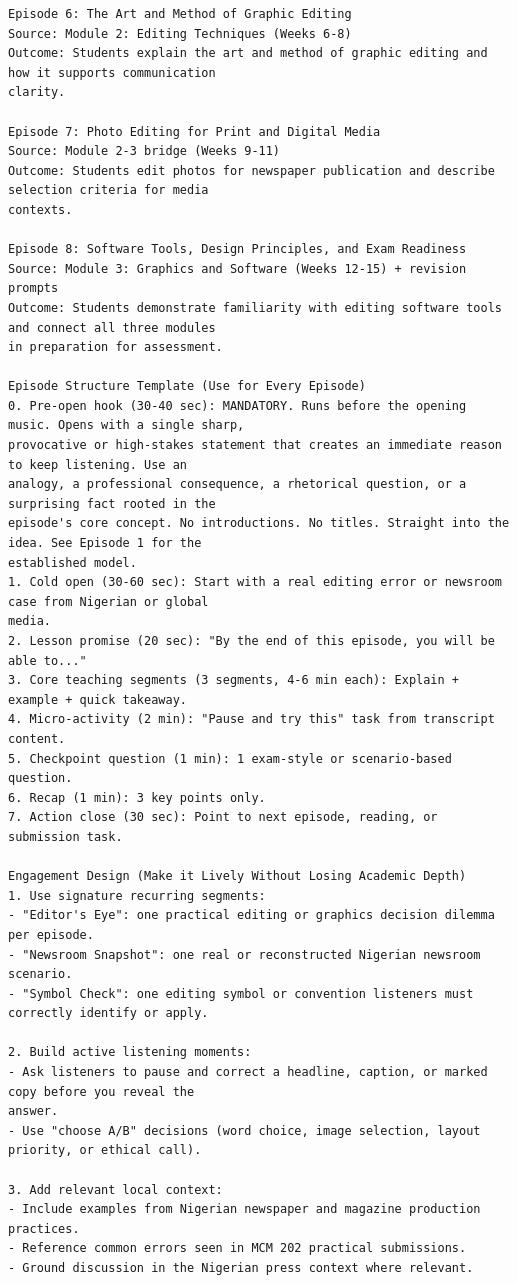 {\begin{Verbatim}
Episode 6: The Art and Method of Graphic Editing
Source: Module 2: Editing Techniques (Weeks 6-8)
Outcome: Students explain the art and method of graphic editing and how it supports communication
clarity.

Episode 7: Photo Editing for Print and Digital Media
Source: Module 2-3 bridge (Weeks 9-11)
Outcome: Students edit photos for newspaper publication and describe selection criteria for media
contexts.

Episode 8: Software Tools, Design Principles, and Exam Readiness
Source: Module 3: Graphics and Software (Weeks 12-15) + revision prompts
Outcome: Students demonstrate familiarity with editing software tools and connect all three modules
in preparation for assessment.

Episode Structure Template (Use for Every Episode)
0. Pre-open hook (30-40 sec): MANDATORY. Runs before the opening music. Opens with a single sharp,
provocative or high-stakes statement that creates an immediate reason to keep listening. Use an
analogy, a professional consequence, a rhetorical question, or a surprising fact rooted in the
episode's core concept. No introductions. No titles. Straight into the idea. See Episode 1 for the
established model.
1. Cold open (30-60 sec): Start with a real editing error or newsroom case from Nigerian or global
media.
2. Lesson promise (20 sec): "By the end of this episode, you will be able to..."
3. Core teaching segments (3 segments, 4-6 min each): Explain + example + quick takeaway.
4. Micro-activity (2 min): "Pause and try this" task from transcript content.
5. Checkpoint question (1 min): 1 exam-style or scenario-based question.
6. Recap (1 min): 3 key points only.
7. Action close (30 sec): Point to next episode, reading, or submission task.

Engagement Design (Make it Lively Without Losing Academic Depth)
1. Use signature recurring segments:
- "Editor's Eye": one practical editing or graphics decision dilemma per episode.
- "Newsroom Snapshot": one real or reconstructed Nigerian newsroom scenario.
- "Symbol Check": one editing symbol or convention listeners must correctly identify or apply.

2. Build active listening moments:
- Ask listeners to pause and correct a headline, caption, or marked copy before you reveal the
answer.
- Use "choose A/B" decisions (word choice, image selection, layout priority, or ethical call).

3. Add relevant local context:
- Include examples from Nigerian newspaper and magazine production practices.
- Reference common errors seen in MCM 202 practical submissions.
- Ground discussion in the Nigerian press context where relevant.


\end{Verbatim}}
